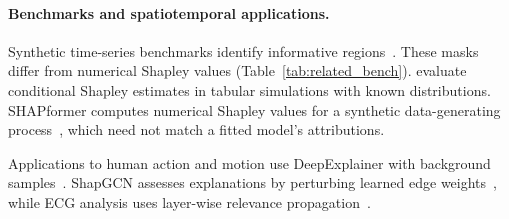 \paragraph{Benchmarks and spatiotemporal applications.}
Synthetic time-series benchmarks identify informative
regions~\citep{ismail2020benchmarking,hollig2023xtsc,baer2026xaitimesynth}.
These masks differ from numerical Shapley values
(Table~\ref{tab:related_bench}).
\citet{olsen2022using,olsen2024comparative} evaluate conditional Shapley
estimates in tabular simulations with known distributions.
SHAPformer computes numerical Shapley values for a synthetic
data-generating process~\citep{hertel2026shapformer}, which need not match
a fitted model's attributions.

Applications to human action and motion use DeepExplainer with background
samples~\citep{auletta2023predicting,tempel2025choose}.
ShapGCN assesses explanations by perturbing learned edge
weights~\citep{tempel2025explaining}, while ECG analysis uses layer-wise
relevance propagation~\citep{strodthoff2021ecg}.